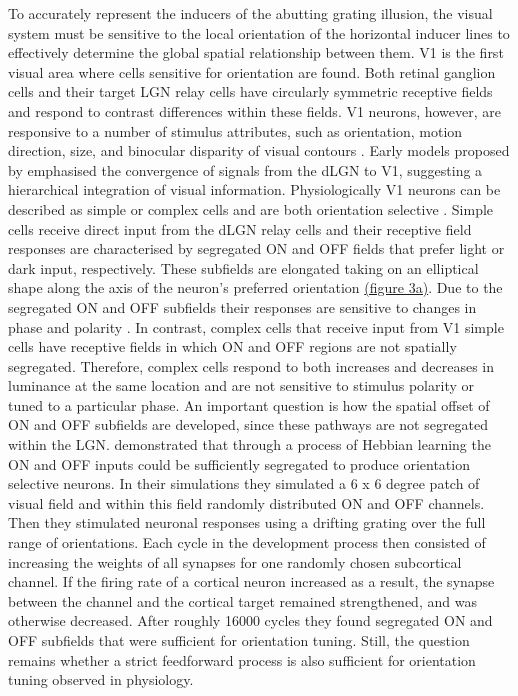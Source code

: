 \documentclass[12pt]{article}
\begin{document}
To accurately represent the inducers of the abutting grating illusion, the visual system must be sensitive to the local orientation of the horizontal inducer lines to effectively determine the global spatial relationship between them. V1 is the first visual area where cells sensitive for orientation are found. Both retinal ganglion cells and their target LGN relay cells have circularly symmetric receptive fields and respond to contrast differences within these fields. V1 neurons, however, are responsive to a number of stimulus attributes, such as orientation, motion direction, size, and binocular disparity of visual contours \autocite{hubelReceptiveFieldsBinocular1962}. Early models proposed by \textcite{hubelReceptiveFieldsBinocular1962} emphasised the convergence of signals from the dLGN to V1, suggesting a hierarchical integration of visual information. Physiologically V1 neurons can be described as simple or complex cells and are both orientation selective \autocite{skottunClassifyingSimpleComplex1991}. Simple cells receive direct input from the dLGN relay cells and their receptive field responses are characterised by segregated ON and OFF fields that prefer light or dark input, respectively. These subfields are elongated taking on an elliptical shape along the axis of the neuron's preferred orientation \hyperref[fig:endstop_mechanism]{(figure 3a)}. Due to the segregated ON and OFF subfields their responses are sensitive to changes in phase and polarity \autocite{mechlerClassificationSimpleComplex2002}. In contrast, complex cells that receive input from V1 simple cells have receptive fields in which ON and OFF regions are not spatially segregated. Therefore, complex cells respond to both increases and decreases in luminance at the same location and are not sensitive to stimulus polarity or tuned to a particular phase. An important question is how the spatial offset of ON and OFF subfields are developed, since these pathways are not segregated within the LGN. \textcite{nguyenModelOriginDevelopment2019} demonstrated that through a process of Hebbian learning the ON and OFF inputs could be sufficiently segregated to produce orientation selective neurons. In their simulations they simulated a 6 x 6 degree patch of visual field and within this field randomly distributed ON and OFF channels. Then they stimulated neuronal responses using a drifting grating over the full range of orientations. Each cycle in the development process then consisted of increasing the weights of all synapses for one randomly chosen subcortical channel. If the firing rate of a cortical neuron increased as a result, the synapse between the channel and the cortical target remained strengthened, and was otherwise decreased. After roughly 16000 cycles they found segregated ON and OFF subfields that were sufficient for orientation tuning. Still, the question remains whether a strict feedforward process is also sufficient for orientation tuning observed in physiology.
\end{document}
